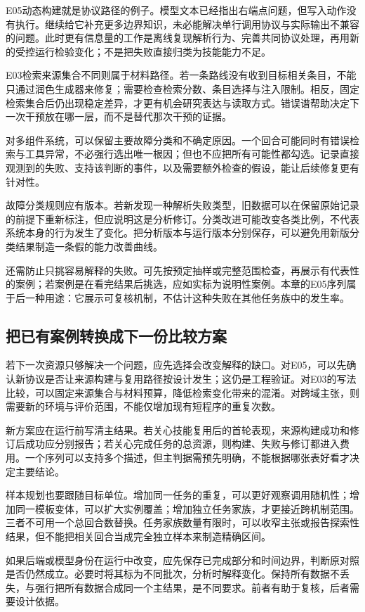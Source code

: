 E05动态构建就是协议路径的例子。模型文本已经指出右端点问题，但写入动作没有执行。继续给它补充更多边界知识，未必能解决单行调用协议与实际输出不兼容的问题。此时更有信息量的工作是离线复现解析行为、完善共同协议处理，再用新的受控运行检验变化；不是把失败直接归类为技能能力不足。

E03检索来源集合不同则属于材料路径。若一条路线没有收到目标相关条目，不能只通过润色生成器来修复；需要检查检索分数、条目选择与注入限制。相反，固定检索集合后仍出现稳定差异，才更有机会研究表达与读取方式。错误谱帮助决定下一次干预放在哪一层，而不是替代那次干预的证据。

对多组件系统，可以保留主要故障分类和不确定原因。一个回合可能同时有错误检索与工具异常，不必强行选出唯一根因；但也不应把所有可能性都勾选。记录直接观测到的失败、支持该判断的事件，以及需要额外检查的假设，能让后续修复更有针对性。

故障分类规则应有版本。若新发现一种解析失败类型，旧数据可以在保留原始记录的前提下重新标注，但应说明这是分析修订。分类改进可能改变各类比例，不代表系统本身的行为发生了变化。把分析版本与运行版本分别保存，可以避免用新版分类结果制造一条假的能力改善曲线。

还需防止只挑容易解释的失败。可先按预定抽样或完整范围检查，再展示有代表性的案例；若案例是在看完结果后挑选，应如实标为说明性案例。本章的E05序列属于后一种用途：它展示可复核机制，不估计这种失败在其他任务族中的发生率。

\subsection{把已有案例转换成下一份比较方案}
\label{sec:ch15-nextcomparison}

若下一次资源只够解决一个问题，应先选择会改变解释的缺口。对E05，可以先确认新协议是否让来源构建与复用路径按设计发生；这仍是工程验证。对E03的写法比较，可以固定来源集合与材料预算，降低检索变化带来的混淆。对跨域主张，则需要新的环境与评价范围，不能仅增加现有短程序的重复次数。

新方案应在运行前写清主结果。若关心技能复用后的首轮表现，来源构建成功和修订后成功应分别报告；若关心完成任务的总资源，则构建、失败与修订都进入费用。一个序列可以支持多个描述，但主判据需预先明确，不能根据哪张表好看才决定主要结论。

样本规划也要跟随目标单位。增加同一任务的重复，可以更好观察调用随机性；增加同一模板变体，可以扩大实例覆盖；增加独立任务家族，才更接近跨机制范围。三者不可用一个总回合数替换。任务家族数量有限时，可以收窄主张或报告探索性结果，但不能把相关回合当成完全独立样本来制造精确区间。

如果后端或模型身份在运行中改变，应先保存已完成部分和时间边界，判断原对照是否仍然成立。必要时将其标为不同批次，分析时解释变化。保持所有数据不丢失，与强行把所有数据合成同一个主结果，是不同要求。前者有助于复核，后者需要设计依据。

